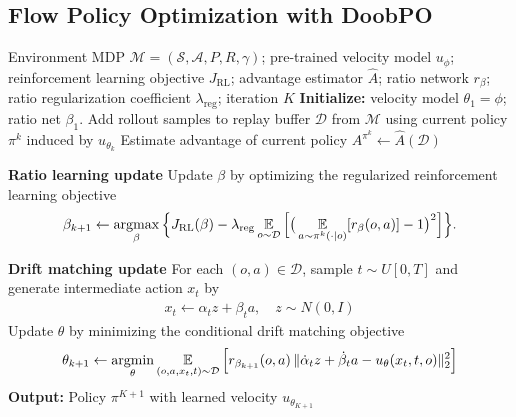 \clearpage
\subsection{Flow Policy Optimization with DoobPO}

\begin{algorithm}[h]
\caption{Flow Policy Optimization with DoobPO}
\label{alg:rwdm_ppo_fm}
\begin{algorithmic}[1]
\Require Environment MDP $\mathcal{M}=(\mathcal{S},\mathcal{A},P,R,\gamma)$;
pre-trained velocity model $u_{\phi}$;
reinforcement learning objective $J_{\mathrm{RL}}$;
advantage estimator $\hat{A}$;
ratio network $r_\beta$;
ratio regularization coefficient $\lambda_{\mathrm{reg}}$;
iteration $K$
\State \textbf{Initialize:} velocity model $\theta_1=\phi$; ratio net $\beta_1$.
    \State Add rollout samples to replay buffer $\mathcal{D}$ from $\mathcal{M}$ using current policy $\pi^k$ induced by $u_{\theta_k}$
    \State Estimate advantage of current policy $A^{\pi^k}\leftarrow \hat{A}(\mathcal{D})$

    \State \textbf{Ratio learning update}
    \State Update $\beta$ by optimizing the regularized reinforcement learning objective
    \begin{align*}
        \beta_{k+1}
        \leftarrow
        \mathop{\mathrm{argmax}}_{\beta}
        \Big\{
        J_{\mathrm{RL}}(\beta)
        -
        \lambda_{\mathrm{reg}}
        \operatorname*{{\mathbb{E}}}_{o\sim\mathcal D}
        \Big[
        \big(
        \operatorname*{{\mathbb{E}}}_{a\sim \pi^k(\cdot|o)}[r_\beta(o,a)]-1
        \big)^2
        \Big]
        \Big\}.
    \end{align*}

    \State \textbf{Drift matching update}
    \State For each $(o,a)\in\mathcal{D}$, sample $t \sim U[0,T]$ and generate intermediate action $x_t$ by
    \begin{align*}
        x_t \leftarrow \alpha_t z
        + \beta_t a,
        \quad z \sim N(0,I)
    \end{align*}
    \State Update $\theta$ by minimizing the conditional drift matching objective
    \begin{align*}
        \theta_{k+1} \leftarrow \mathop{\mathrm{argmin}}_{\theta}
        \operatorname*{{\mathbb{E}}}_{(o,a,x_t,t)\sim \mathcal{D}}
        \Big[ r_{\beta_{k+1}}(o,a)\,
        \|
            \dot{\alpha}_t z + \dot{\beta}_t a
            - u_\theta(x_t,t,o)
        \|_2^2
        \Big]
    \end{align*}
\EndFor
\State \textbf{Output:} Policy $\pi^{K+1}$ with learned velocity $u_{\theta_{K+1}}$
\end{algorithmic}
\end{algorithm}

